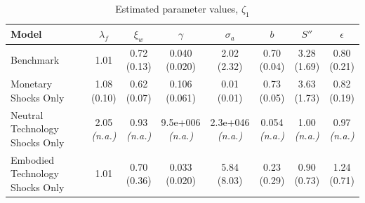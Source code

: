 \begin{table}[htbp]
    \centering
    \small
    \renewcommand{\arraystretch}{1.35}
    \setlength{\tabcolsep}{5pt}
    \caption{Estimated parameter values, $\zeta_1$}
    \label{tab:acel2005wp_table2}
    \begin{tabular}{|l|c|c|c|c|c|c|c|}
        \hline\hline
        Model & $\lambda_f$ & $\xi_w$ & $\gamma$ & $\sigma_a$ & $b$ & $S''$ & $\epsilon$ \\
        \hline
        Benchmark
            & \shortstack{1.01\\\mbox{}} & \shortstack{0.72\\(0.13)} & \shortstack{0.040\\(0.020)} & \shortstack{2.02\\(2.32)} & \shortstack{0.70\\(0.04)} & \shortstack{3.28\\(1.69)} & \shortstack{0.80\\(0.21)} \\
        \hline
        Monetary Shocks Only
            & \shortstack{1.08\\(0.10)} & \shortstack{0.62\\(0.07)} & \shortstack{0.106\\(0.061)} & \shortstack{0.01\\(0.01)} & \shortstack{0.73\\(0.05)} & \shortstack{3.63\\(1.73)} & \shortstack{0.82\\(0.19)} \\
        \hline
        Neutral Technology Shocks Only
            & \shortstack{2.05\\\textit{(n.a.)}} & \shortstack{0.93\\\textit{(n.a.)}} & \shortstack{9.5e+006\\\textit{(n.a.)}} & \shortstack{2.3e+046\\\textit{(n.a.)}} & \shortstack{0.054\\\textit{(n.a.)}} & \shortstack{1.00\\\textit{(n.a.)}} & \shortstack{0.97\\\textit{(n.a.)}} \\
        \hline
        Embodied Technology Shocks Only
            & \shortstack{1.01\\\mbox{}} & \shortstack{0.70\\(0.36)} & \shortstack{0.033\\(0.020)} & \shortstack{5.84\\(8.03)} & \shortstack{0.23\\(0.29)} & \shortstack{0.90\\(0.73)} & \shortstack{1.24\\(0.71)} \\

\end{tabular}
\end{table}
